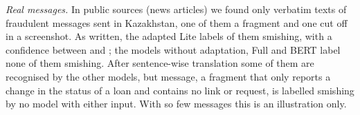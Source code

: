 \emph{Real messages.} In public sources (news articles) we found only  verbatim texts of fraudulent messages sent in Kazakhstan, one of them a fragment and one cut off in a screenshot. As written, the adapted Lite labels  of them smishing, with a confidence between  and ; the models without adaptation, Full and BERT label none of them smishing. After sentence-wise translation some of them are recognised by the other models, but  message, a fragment that only reports a change in the status of a loan and contains no link or request, is labelled smishing by no model with either input. With so few messages this is an illustration only.
